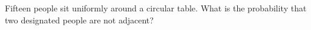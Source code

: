 Fifteen people sit uniformly around a circular table. What is the probability that two designated people are not adjacent?
